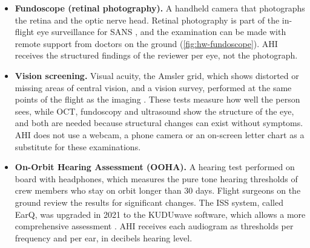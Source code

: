 \begin{itemize}
\item \textbf{Fundoscope (retinal photography).} A handheld camera that photographs the retina and the optic nerve head. Retinal photography is part of the in-flight eye surveillance for SANS \cite{brunstetter2023brief}, and the examination can be made with remote support from doctors on the ground (\ref{fig:hw-fundoscope}). AHI receives the structured findings of the reviewer per eye, not the photograph.
\item \textbf{Vision screening.} Visual acuity, the Amsler grid, which shows distorted or missing areas of central vision, and a vision survey, performed at the same points of the flight as the imaging \cite{brunstetter2023brief}. These tests measure how well the person sees, while OCT, fundoscopy and ultrasound show the structure of the eye, and both are needed because structural changes can exist without symptoms. AHI does not use a webcam, a phone camera or an on-screen letter chart as a substitute for these examinations.
\item \textbf{On-Orbit Hearing Assessment (OOHA).} A hearing test performed on board with headphones, which measures the pure tone hearing thresholds of crew members who stay on orbit longer than 30 days. Flight surgeons on the ground review the results for significant changes. The ISS system, called EarQ, was upgraded in 2021 to the KUDUwave software, which allows a more comprehensive assessment \cite{coste2024hearing}. AHI receives each audiogram as thresholds per frequency and per ear, in decibels hearing level.
\end{itemize}





